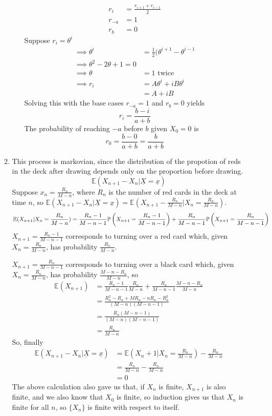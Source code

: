 \documentclass{article}
\begin{document}
\begin{enumerate}
\begin{enumerate}
\begin{enumerate}
\begin{align*}
r_i &= \frac{r_{i+1}+r_{i-1}}{2}\\
r_{-a} &= 1\\
r_b &= 0
\end{align*}
Suppose $r_i= \theta^i$
\begin{align*}
\implies \theta^i &= \frac{1}{2}(\theta^{i+1}-\theta^{i-1}\\
\implies \theta^2 -2\theta +1 = 0\\
\implies \theta &= 1 \mbox{ twice}\\
\implies r_i &= A\theta^i +iB\theta^i\\
&= A+iB
\end{align*}
Solving this with the base cases $r_{-a}=1$ and $r_{b}=0$ yields
$$
r_i = \frac{b-i}{a+b}
$$
The probability of reaching $-a$ before $b$ given $X_0 = 0$ is
$$
r_0 = \frac{b-0}{a+b} = \frac{b}{a+b}
$$
\end{enumerate}
\item
This process is markovian, since the distribution of the propotion of reds in the deck after drawing depends only on the proportion before drawing.
$$
\mathbb{E}(X_{n+1} - X_n | \underline{X} = \underline{x})
$$
Suppose $x_n = \frac{R_n}{M-n}$, where $R_n$ is the number of red cards in the deck at time $n$, so $\mathbb{E}(X_{n+1} - X_n | \underline{X} = \underline{x}) = \mathbb{E}(X_{n+1} - \frac{R_n}{M-n}| X_n = \frac{R_n}{M-n})$.
$$
\mathbb{E}(X_{n+1} | X_n = \frac{R_n}{M-n}) = \frac{R_n-1}{M-n-1}\mathbb{P}\left(X_{n+1} = \frac{R_n-1}{M-n-1}\right) + \frac{R_n}{M-n-1} \mathbb{P} \left( X_{n+1} = \frac{R_n}{M-n-1}\right)
$$
$X_{n+1} = \frac{R_n-1}{M-n-1}$ corresponds to turning over a red card which, given $X_n = \frac{R_n}{M-n}$, has probability $\frac{R_n}{M-n}$.

$X_{n+1} = \frac{R_n}{M-n-1}$ corresponds to turning over a black card which, given $X_n = \frac{R_n}{M-n}$, has probability $\frac{M-n-R_n}{M-n}$, so
\begin{align*}
\mathbb{E}(X_{n+1}) &= \frac{R_n-1}{M-n-1}\frac{R_n}{M-n} + \frac{R_n}{M-n-1} \frac{M-n-R_n}{M-n}\\
&= \frac{R_n^2 - R_n + MR_n - nR_n - R_n^2}{(M-n)(M-n-1)}\\
&= \frac{R_n(M-n-1)}{(M-n)(M-n-1)}\\
&= \frac{R_n}{M-n}
\end{align*}
So, finally
\begin{align*}
\mathbb{E}(X_{n+1}-X_n | \underline{X} = \underline{x}) &= \mathbb{E}\left(X_n+1|X_n = \frac{R_n}{M-n}\right) - \frac{R_n}{M-n}\\
&= \frac{R_n}{M-n} - \frac{R_n}{M-n}\\
&= 0
\end{align*}
The above calculation also gave us that, if $X_n$ is finite, $X_{n+1}$ is also finite, and we also know that $X_0$ is finite, so induction gives us that $X_n$ is finite for all $n$, so $\{X_n\}$ is finite with respect to itself.
\end{enumerate}
\end{enumerate}
\clearpage
\end{document}
